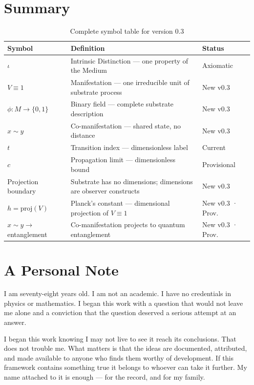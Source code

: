 \documentclass[12pt, letterpaper]{article}
\begin{document}
\section{Summary}
\label{sec:org8aa6740}

\begin{table}[htbp]
\caption{\label{tab:summary}Complete symbol table for version 0.3}
\centering
\begin{tabular}{llp{3.8cm}}
\toprule
\textbf{Symbol} & \textbf{Definition} & \textbf{Status}\\
\midrule
\(\iota\) & Intrinsic Distinction --- one property of the Medium & Axiomatic\\
\(V \equiv 1\) & Manifestation --- one irreducible unit of substrate process & New v0.3\\
\(\phi : M \to \{0,1\}\) & Binary field --- complete substrate description & New v0.3\\
\(x \sim y\) & Co-manifestation --- shared state, no distance & New v0.3\\
\(t\) & Transition index --- dimensionless label & Current\\
\(c\) & Propagation limit --- dimensionless bound & Provisional\\
Projection boundary & Substrate has no dimensions; dimensions are observer constructs & New v0.3\\
\(h = \mathrm{proj}(V)\) & Planck's constant --- dimensional projection of \(V \equiv 1\) & New v0.3 · Prov.\\
\(x \sim y \to\) entanglement & Co-manifestation projects to quantum entanglement & New v0.3 · Prov.\\
\bottomrule
\end{tabular}
\end{table}
\section{A Personal Note}
\label{sec:org0efbbc9}

I am seventy-eight years old. I am not an academic. I have no credentials in
physics or mathematics. I began this work with a question that would not leave
me alone and a conviction that the question deserved a serious attempt at an
answer.

I began this work knowing I may not live to see it reach its conclusions. That
does not trouble me. What matters is that the ideas are documented, attributed,
and made available to anyone who finds them worthy of development. If this
framework contains something true it belongs to whoever can take it further. My
name attached to it is enough --- for the record, and for my family.
\end{document}
